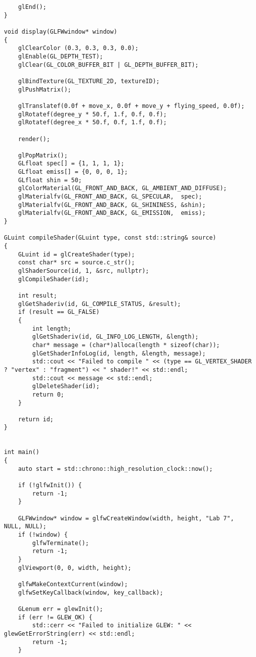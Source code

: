 \documentclass[a4paper, 14pt]{extarticle}
\begin{document}
\begin{verbatim}
    glEnd();
}

void display(GLFWwindow* window)
{
    glClearColor (0.3, 0.3, 0.3, 0.0);
    glEnable(GL_DEPTH_TEST);
    glClear(GL_COLOR_BUFFER_BIT | GL_DEPTH_BUFFER_BIT);

    glBindTexture(GL_TEXTURE_2D, textureID);
    glPushMatrix();

    glTranslatef(0.0f + move_x, 0.0f + move_y + flying_speed, 0.0f);
    glRotatef(degree_y * 50.f, 1.f, 0.f, 0.f);
    glRotatef(degree_x * 50.f, 0.f, 1.f, 0.f);

    render();

    glPopMatrix();
    GLfloat spec[] = {1, 1, 1, 1};
    GLfloat emiss[] = {0, 0, 0, 1};
    GLfloat shin = 50;
    glColorMaterial(GL_FRONT_AND_BACK, GL_AMBIENT_AND_DIFFUSE);
    glMaterialfv(GL_FRONT_AND_BACK, GL_SPECULAR,  spec);
    glMaterialfv(GL_FRONT_AND_BACK, GL_SHININESS, &shin);
    glMaterialfv(GL_FRONT_AND_BACK, GL_EMISSION,  emiss);
}

GLuint compileShader(GLuint type, const std::string& source)
{
    GLuint id = glCreateShader(type);
    const char* src = source.c_str();
    glShaderSource(id, 1, &src, nullptr);
    glCompileShader(id);

    int result;
    glGetShaderiv(id, GL_COMPILE_STATUS, &result);
    if (result == GL_FALSE)
    {
        int length;
        glGetShaderiv(id, GL_INFO_LOG_LENGTH, &length);
        char* message = (char*)alloca(length * sizeof(char));
        glGetShaderInfoLog(id, length, &length, message);
        std::cout << "Failed to compile " << (type == GL_VERTEX_SHADER ? "vertex" : "fragment") << " shader!" << std::endl;
        std::cout << message << std::endl;
        glDeleteShader(id);
        return 0;
    }

    return id;
}


int main()
{
    auto start = std::chrono::high_resolution_clock::now();

    if (!glfwInit()) {
        return -1;
    }

    GLFWwindow* window = glfwCreateWindow(width, height, "Lab 7", NULL, NULL);
    if (!window) {
        glfwTerminate();
        return -1;
    }
    glViewport(0, 0, width, height);

    glfwMakeContextCurrent(window);
    glfwSetKeyCallback(window, key_callback);

    GLenum err = glewInit();
    if (err != GLEW_OK) {
        std::cerr << "Failed to initialize GLEW: " << glewGetErrorString(err) << std::endl;
        return -1;
    }
   

\end{verbatim}
\end{document}
